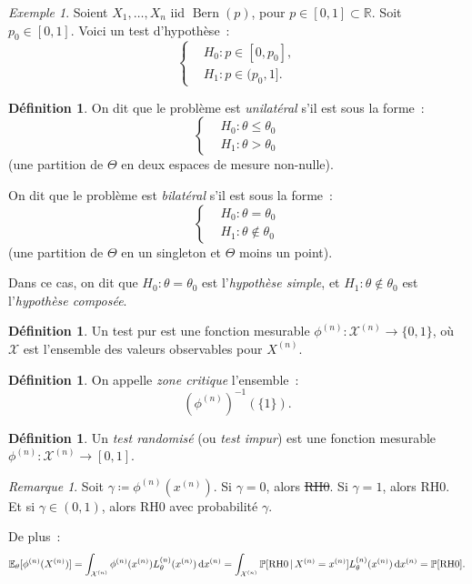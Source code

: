 \documentclass{report}
\DeclareMathOperator{\Bern}{Bern}  %
\renewcommand{\P}{\mathbb P}
\newcommand{\E}{\mathbb E}
\newcommand{\R}{\mathbb R}
\newcommand{\n}{{(n)}}
\theoremstyle{definition}
\newtheorem{déf}[thm]{Définition}
\theoremstyle{remark}
\newtheorem*{rmq}{Remarque}
\newtheorem{ex}{Exemple}[chapter]
\begin{document}
	\begin{ex} Soient $X_1, \ldots, X_n$ iid $\Bern(p)$, pour $p \in [0, 1] \subset \R$. Soit $p_0 \in [0, 1]$. Voici un test d'hypothèse~:
	\[\begin{cases}
		&H_0 : p \in [0, p_0], \\
		&H_1 : p \in (p_0, 1].
	\end{cases}\]
	\end{ex}

	\begin{déf} On dit que le problème est \textit{unilatéral} s'il est sous la forme~:
	\[\begin{cases}
		&H_0 : \theta \leq \theta_0 \\
		&H_1 : \theta > \theta_0
	\end{cases}\]
	(une partition de $\Theta$ en deux espaces de mesure non-nulle).

	On dit que le problème est \textit{bilatéral} s'il est sous la forme~:
	\[\begin{cases}
		&H_0 : \theta = \theta_0 \\
		&H_1 : \theta \not \in \theta_0
	\end{cases}\]
	(une partition de $\Theta$ en un singleton et $\Theta$ moins un point).

	Dans ce cas, on dit que $H_0 : \theta = \theta_0$ est l'\textit{hypothèse simple}, et $H_1 : \theta \not \in \theta_0$ est l'\textit{hypothèse composée}.
	\end{déf}

	\begin{déf} Un test pur est une fonction mesurable $\phi^\n : \mathcal X^\n \to \{0, 1\}$, où $\mathcal X$ est l'ensemble des valeurs observables pour $X^\n$.
	\end{déf}

	\begin{déf} On appelle \textit{zone critique} l'ensemble~:
	\[\left(\phi^\n\right)^{-1}\left(\{1\}\right).\]
	\end{déf}

	\begin{déf} Un \textit{test randomisé} (ou \textit{test impur}) est une fonction mesurable $\phi^\n : \mathcal X^\n \to [0, 1]$.
	\end{déf}

	\begin{rmq} Soit $\gamma \coloneqq \phi^\n(x^\n)$. Si $\gamma = 0$, alors \sout {RH0}. Si $\gamma = 1$, alors RH0. Et si $\gamma \in (0, 1)$, alors
	RH0 avec probabilité $\gamma$.

	De plus~:
	\[\E_\theta[\phi^\n(X^\n)] = \int_{\mathcal X^\n}\phi^\n(x^\n)L_\theta^\n(x^\n)\dif x^\n
		= \int_{\mathcal X^\n}\P[\text{RH0} \, | \, X^\n = x^\n]L_\theta^\n(x^\n)\dif x^\n
		= \P[\text{RH0}].\]
	\end{rmq}
\end{document}
